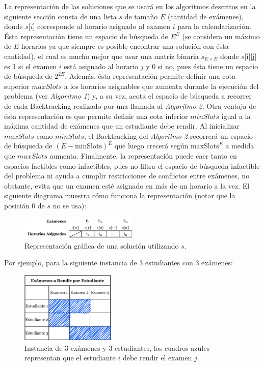 \documentclass[letter, 10pt]{article}
\begin{document}
La representación de las soluciones que se usará en los algoritmos descritos en la siguiente sección consta de una lista $s$ de tamaño $E$ (cantidad de exámenes), donde $s$[$i$] corresponde al horario asignado al examen $i$ para la calendarización. Ésta representación tiene un espacio de búsqueda de $E^{E}$ (se considera un máximo de $E$ horarios ya que siempre es posible encontrar una solución con ésta cantidad), el cual es mucho mejor que usar una matriz binaria $s_{E \times E}$ donde $s$[i][j] es 1 si el examen $i$ está asignado al horario $j$ y 0 si no, pues ésta tiene un espacio de búsqueda de $2^{2E}$. Además, ésta representación permite definir una cota superior $maxSlots$ a los horarios asignables que aumenta durante la ejecución del problema (ver \textit{Algoritmo 1}) y, a su vez, acota el espacio de búsqueda a recorrer de cada Backtracking realizado por una llamada al \textit{Algoritmo 2}. Otra ventaja de ésta representación es que permite definir una cota inferior $minSlots$ igual a la máxima cantidad de exámenes que un estudiante debe rendir. Al inicializar $maxSlots$ como $minSlots$, el Backtracking del \textit{Algoritmo 2} recorrerá un espacio de búsqueda de $(E-\text{minSlots})^{E}$ que luego crecerá según $\text{maxSlots}^{E}$ a medida que $maxSlots$ aumenta. Finalmente, la representación puede caer tanto en espacios factibles como infactibles, pues no filtra el espacio de búsqueda infactible del problema ni ayuda a cumplir restricciones de conflictos entre exámenes, no obstante, evita que un examen esté asignado en más de un horario a la vez. El siguiente diagrama muestra cómo funciona la representación (notar que la posición 0 de $s$ no se usa):

\begin{figure}[H]
\begin{center}
\includegraphics[width=0.5\textwidth]{img/s2.pdf}
\end{center}
\caption{Representación gráfica de una solución utilizando $s$.}
\label{fig:s1}
\end{figure}

Por ejemplo, para la siguiente instancia de 3 estudiantes con 3 exámenes:

\begin{figure}[H]
\begin{center}
\includegraphics[width=0.4\textwidth]{img/s3.pdf}
\end{center}
\caption{Instancia de 3 exámenes y 3 estudiantes, los cuadros azules representan que el estudiante $i$ debe rendir el examen $j$.}
\label{fig:s2}
\end{figure}
\end{document}
